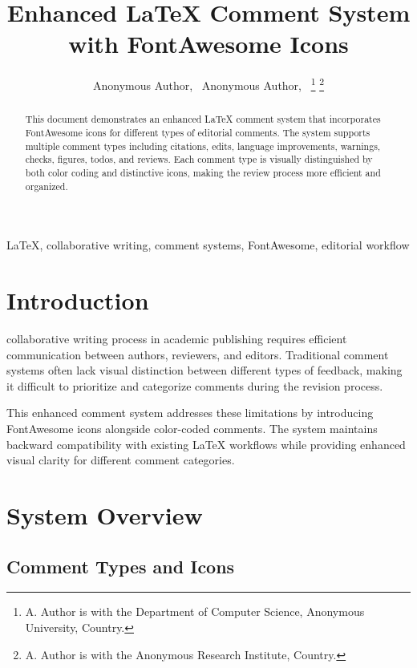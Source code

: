 \documentclass[magazine]{IEEEtran}
\title{Enhanced LaTeX Comment System with FontAwesome Icons}
\author{Anonymous Author,~\IEEEmembership{Member,~IEEE,}
        Anonymous Author,~\IEEEmembership{Senior~Member,~IEEE}
\thanks{A. Author is with the Department of Computer Science, Anonymous University, Country.}
\thanks{A. Author is with the Anonymous Research Institute, Country.}}
\begin{document}
\maketitle

\begin{abstract}
This document demonstrates an enhanced LaTeX comment system that incorporates FontAwesome icons for different types of editorial comments. The system supports multiple comment types including citations, edits, language improvements, warnings, checks, figures, todos, and reviews. Each comment type is visually distinguished by both color coding and distinctive icons, making the review process more efficient and organized.
\end{abstract}

\begin{IEEEkeywords}
LaTeX, collaborative writing, comment systems, FontAwesome, editorial workflow
\end{IEEEkeywords}

\section{Introduction}

 collaborative writing process in academic publishing requires efficient communication between authors, reviewers, and editors. Traditional comment systems often lack visual distinction between different types of feedback, making it difficult to prioritize and categorize comments during the revision process.


This enhanced comment system addresses these limitations by introducing FontAwesome icons alongside color-coded comments. The system maintains backward compatibility with existing LaTeX workflows while providing enhanced visual clarity for different comment categories.


\section{System Overview}

\subsection{Comment Types and Icons}
\end{document}
